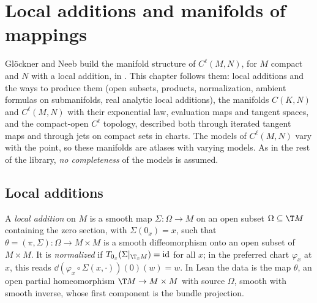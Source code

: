 \chapter{Local additions and manifolds of mappings}
\label{chap:mapping}

Glöckner and Neeb build the manifold structure of $C^\ell(M, N)$, for $M$ compact and $N$ with a
local addition, in \cite[\S3.8, \S4.1, \S4.2]{GN26}. This chapter follows them: local additions
and the ways to produce them (open subsets, products, normalization, ambient formulas on
submanifolds, real analytic local additions), the manifolds $C(K, N)$ and $C^\ell(M, N)$ with
their exponential law, evaluation maps and tangent spaces, and the compact-open $C^\ell$ topology,
described both through iterated tangent maps \cite[Def.~4.1.2]{GN26} and through jets on compact
sets in charts. The models of $C^\ell(M, N)$ vary with the point, so these manifolds are atlases
with varying models. As in the rest of the library, \emph{no completeness} of the models is
assumed.

\section{Local additions}

\begin{definition}
  \label{def:local-addition}
  \leanok
  A \emph{local addition} on $M$ is a smooth map $\Sigma \colon \Omega \to M$ on an open subset
  $\Omega \subseteq \T M$ containing the zero section, with $\Sigma(0_x) = x$, such that
  $\theta = (\pi, \Sigma) \colon \Omega \to M \times M$ is a smooth diffeomorphism onto an open
  subset of $M \times M$. It is \emph{normalized} if $T_{0_x}(\Sigma|_{\T_x M}) = \mathrm{id}$
  for all $x$; in the preferred chart $\varphi_x$ at $x$, this reads
  $\dd(\varphi_x \circ \Sigma(x, \cdot))(0)(w) = w$. In Lean the data is the map $\theta$, an
  open partial homeomorphism $\T M \to M \times M$ with source $\Omega$, smooth with smooth
  inverse, whose first component is the bundle projection.
\end{definition}

